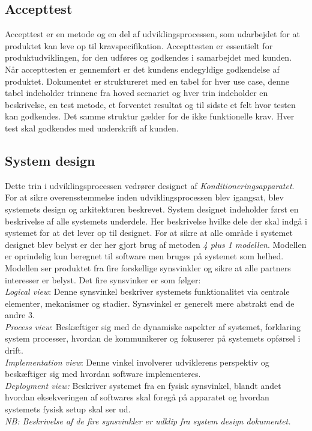 	\subsection{Accepttest} \label{title:accepttest}
	Accepttest er en metode og en del af udviklingsprocessen, som udarbejdet for at produktet kan leve op til kravspecifikation. Accepttesten er essentielt for produktudviklingen, for den udføres og godkendes i samarbejdet med kunden. Når accepttesten er gennemført er det kundens endegyldige godkendelse af produktet. 
	Dokumentet er struktureret med en tabel for hver use case, denne tabel indeholder trinnene fra hoved scenariet og hver trin indeholder en beskrivelse, en test metode, et forventet resultat og til sidste et felt hvor testen kan godkendes. Det samme struktur gælder for de ikke funktionelle krav. Hver test skal godkendes med underskrift af kunden.
	
	\subsection{System design} \label{title:systemdesign}
	Dette trin i udviklingsprocessen vedrører designet af \textit{Konditioneringsapparatet}. For at sikre overensstemmelse inden udviklingsprocessen blev igangsat, blev systemets design og arkitekturen beskrevet. System designet indeholder først en beskrivelse af alle systemets underdele. Her beskrivelse hvilke dele der skal indgå i systemet for at det lever op til designet.
	For at sikre at alle område i systemet designet blev belyst er der her gjort brug af metoden \textit{4 plus 1 modellen}. Modellen er oprindelig kun beregnet til software men bruges på systemet som helhed. Modellen ser produktet fra fire forskellige synsvinkler og sikre at alle partners interesser er belyst. Det fire synsvinker er som følger: 
	\\ \textit{Logical view}: Denne synsvinkel beskriver systemets funktionalitet via centrale elementer, mekanismer og stadier. Synsvinkel er generelt mere abstrakt end de andre 3. \\
	\textit{Process view}: Beskæftiger sig med de dynamiske aspekter af systemet, forklaring system processer, hvordan de kommunikerer og fokuserer på systemets opførsel i drift. \\
	\textit{Implementation view}: Denne vinkel involverer udviklerens perspektiv og beskæftiger sig med hvordan software implementeres. \\
	\textit{Deployment view:} Beskriver systemet fra en fysisk synsvinkel, blandt andet hvordan eksekveringen af softwares skal foregå på apparatet og hvordan systemets fysisk setup skal ser ud. \\
	\textit{NB: Beskrivelse af de fire synsvinkler er udklip fra system design dokumentet.} 
	
